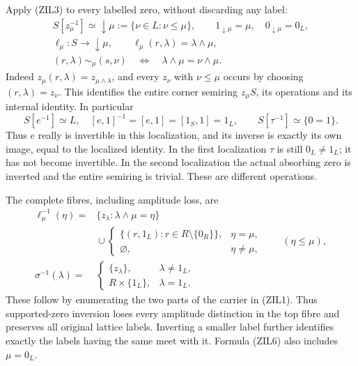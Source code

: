Apply (ZIL3) to every labelled zero, without discarding any label:
\begin{equation}\tag{ZIL4}
\begin{gathered}
 S[z_\mu^{-1}]\simeq\downarrow\mu
     :=\{\nu\in L:\nu\le\mu\},\qquad
 1_{\downarrow\mu}=\mu,\quad0_{\downarrow\mu}=0_L,\\
 \ell_\mu:S\longrightarrow\downarrow\mu,
       \qquad\ell_\mu(r,\lambda)=\lambda\wedge\mu,\\
 (r,\lambda)\sim_\mu(s,\nu)
       \quad\Longleftrightarrow\quad
       \lambda\wedge\mu=\nu\wedge\mu.
\end{gathered}
\end{equation}
Indeed $z_\mu(r,\lambda)=z_{\mu\wedge\lambda}$, and every
$z_\nu$ with $\nu\le\mu$ occurs by choosing $(r,\lambda)=z_\nu$.
This identifies the entire corner semiring $z_\mu S$, its operations
and its internal identity. In particular
\begin{equation}\tag{ZIL5}
 S[e^{-1}]\simeq L,\quad [e,1]^{-1}=[e,1]=[1_S,1]=1_L,
 \qquad S[\tau^{-1}]\simeq\{0=1\}.
\end{equation}
Thus $e$ really is invertible in this localization, and its inverse
is exactly its own image, equal to the localized identity.
In the first localization $\tau$ is still $0_L\ne1_L$; it has
not become invertible. In the second localization the actual
absorbing zero is inverted and the entire semiring is trivial.
These are different operations.

The complete fibres, including amplitude loss, are
\begin{equation}\tag{ZIL6}
\begin{split}
 \ell_\mu^{-1}(\eta)
   ={}&\{z_\lambda:\lambda\wedge\mu=\eta\}\\
      &{}\cup
       \begin{cases}
        \{(r,1_L):r\in R\setminus\{0_R\}\},&\eta=\mu,\\
        \varnothing,&\eta\ne\mu,
       \end{cases}
       \qquad(\eta\le\mu),\\
 \sigma^{-1}(\lambda)
   ={}&\begin{cases}
       \{z_\lambda\},&\lambda\ne1_L,\\
       R\times\{1_L\},&\lambda=1_L.
      \end{cases}
\end{split}
\end{equation}
These follow by enumerating the two parts of the carrier in (ZIL1).
Thus supported-zero inversion loses every amplitude distinction in
the top fibre and preserves all original lattice labels. Inverting
a smaller label further identifies exactly the labels having the
same meet with it. Formula (ZIL6) also includes $\mu=0_L$.

